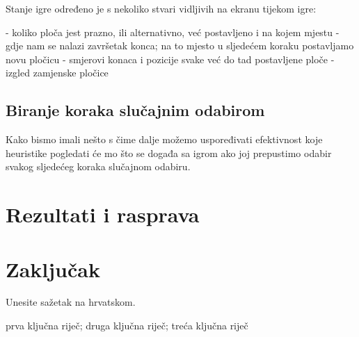 \documentclass[zavrsnirad]{fer}
\begin{document}
Stanje igre određeno je s nekoliko stvari vidljivih na ekranu tijekom igre: 

- koliko ploča jest prazno, ili alternativno, već postavljeno i na kojem mjestu
- gdje nam se nalazi završetak konca; na to mjesto u sljedećem koraku postavljamo novu pločicu
- smjerovi konaca i pozicije svake već do tad postavljene ploče
- izgled zamjenske pločice


\section{Biranje koraka slučajnim odabirom}
\label{pog:slucajan_odabir}

Kako bismo imali nešto s čime dalje možemo uspoređivati efektivnost koje heuristike pogledati će mo što se događa sa igrom ako joj prepustimo odabir svakog sljedećeg koraka slučajnom odabiru. 



\chapter{Rezultati i rasprava}
\label{pog:rezultati_i_rasprava}

\Blindtext


\chapter{Zaključak}
\label{pog:zakljucak}

\blindtext








\begin{sazetak}
  Unesite sažetak na hrvatskom.

  \blindtext
\end{sazetak}

\begin{kljucnerijeci}
  prva ključna riječ; druga ključna riječ; treća ključna riječ
\end{kljucnerijeci}
\end{document}
